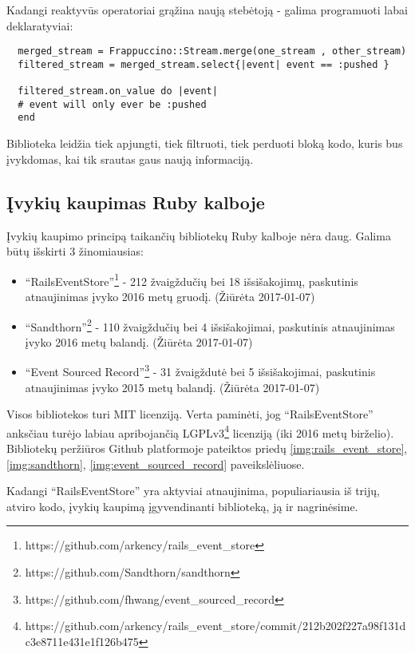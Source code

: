 Kadangi reaktyvūs operatoriai grąžina naują stebėtoją - galima programuoti labai deklaratyviai:

\begin{lstlisting}
  merged_stream = Frappuccino::Stream.merge(one_stream , other_stream)
  filtered_stream = merged_stream.select{|event| event == :pushed }

  filtered_stream.on_value do |event|
  # event will only ever be :pushed
  end
\end{lstlisting}

Biblioteka leidžia tiek apjungti, tiek filtruoti, tiek perduoti bloką kodo, kuris bus įvykdomas, kai tik srautas gaus naują informaciją.

\subsection{Įvykių kaupimas Ruby kalboje}

Įvykių kaupimo principą taikančių bibliotekų Ruby kalboje nėra daug. Galima būtų išskirti 3 žinomiausias:

\begin{itemize}
  \item ``RailsEventStore''\footnote{https://github.com/arkency/rails\_event\_store} - 212 žvaigždučių bei 18 išsišakojimų, paskutinis atnaujinimas įvyko 2016 metų gruodį. (Žiūrėta 2017-01-07)

  \item ``Sandthorn''\footnote{https://github.com/Sandthorn/sandthorn} - 110 žvaigždučių bei 4 išsišakojimai, paskutinis atnaujinimas įvyko 2016 metų balandį. (Žiūrėta 2017-01-07)

  \item ``Event Sourced Record''\footnote{https://github.com/fhwang/event\_sourced\_record} - 31 žvaigždutė bei 5 išsišakojimai, paskutinis atnaujinimas įvyko 2015 metų balandį. (Žiūrėta 2017-01-07)
\end{itemize}

Visos bibliotekos turi MIT licenziją. Verta paminėti, jog ``RailsEventStore'' anksčiau turėjo labiau apribojančią LGPLv3\footnote{https://github.com/arkency/rails\_event\_store/commit/212b202f227a98f131dc3e8711e431e1f126b475} licenziją (iki 2016 metų birželio). Bibliotekų peržiūros Github platformoje pateiktos priedų \ref{img:rails_event_store}, \ref{img:sandthorn}, \ref{img:event_sourced_record} paveikslėliuose.

Kadangi ``RailsEventStore'' yra aktyviai atnaujinima, populiariausia iš trijų, atviro kodo, įvykių kaupimą įgyvendinanti biblioteką, ją ir nagrinėsime.

